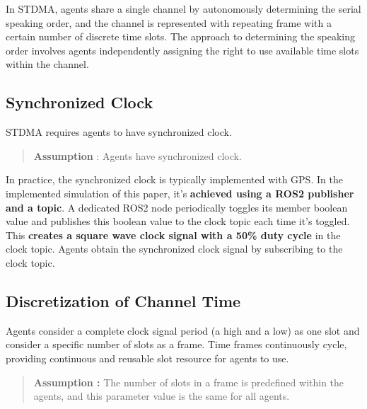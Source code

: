 In STDMA, agents share a single channel by autonomously determining the serial speaking order, and the channel is represented with repeating frame with a certain number of discrete time slots.
The approach to determining the speaking order involves agents independently assigning the right to use available time slots within the channel.

\subsection{Synchronized Clock}

STDMA requires agents to have synchronized clock.

\begin{quotation}
    \textbf{Assumption }:  
    Agents have synchronized clock. 
\end{quotation}

In practice, the synchronized clock is typically implemented with GPS. 
In the implemented simulation of this paper, it's \textbf{achieved using a ROS2 publisher and a topic}.
A dedicated ROS2 node periodically toggles its member boolean value and publishes this boolean value to the clock topic each time it's toggled. This \textbf{creates a square wave clock signal with a 50\% duty cycle} in the clock topic.
Agents obtain the synchronized clock signal by subscribing to the clock topic.

\subsection{Discretization of Channel Time}
\label{chap:sending time window}
Agents consider a complete clock signal period (a high and a low) as one slot and consider a specific number of slots as a frame.
Time frames continuously cycle, providing continuous and reusable slot resource for agents to use.


\begin{quotation}
    \textbf{Assumption :}  
    The number of slots in a frame is predefined within the agents, and this parameter value is the same for all agents.
\end{quotation}

